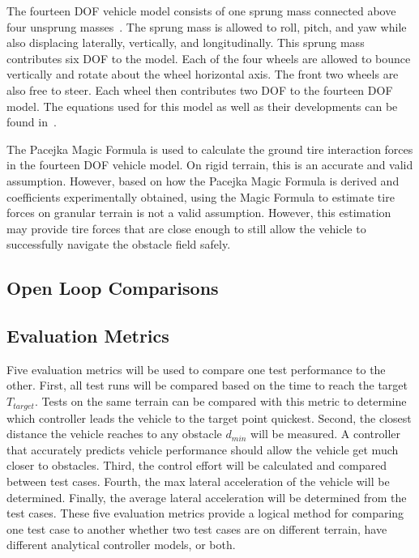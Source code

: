 \documentclass[12pt,twocolumn]{article}
\begin{document}
The fourteen DOF vehicle model consists of one sprung mass connected above four unsprung masses~\cite{RollStudies2007}. The sprung mass is allowed to roll, pitch, and yaw while also displacing laterally, vertically, and longitudinally. This sprung mass contributes six DOF to the model. Each of the four wheels are allowed to bounce vertically and rotate about the wheel horizontal axis. The front two wheels are also free to steer. Each wheel then contributes two DOF to the fourteen DOF model. The equations used for this model as well as their developments can be found in~\cite{RollStudies2007}.

The Pacejka Magic Formula is used to calculate the ground tire interaction forces in the fourteen DOF vehicle model. On rigid terrain, this is an accurate and valid assumption. However, based on how the Pacejka Magic Formula is derived and coefficients experimentally obtained, using the Magic Formula to estimate tire forces on granular terrain is not a valid assumption. However, this estimation may provide tire forces that are close enough to still allow the vehicle to successfully navigate the obstacle field safely. 

\subsection{Open Loop Comparisons }\label{ss:OpenLoop}


\subsection{Evaluation Metrics}\label{ss:Metrics}
Five evaluation metrics will be used to compare one test performance to the other. First, all test runs will be compared based on the time to reach the target $T_{target}$. Tests on the same terrain can be compared with this metric to determine which controller leads the vehicle to the target point quickest. Second, the closest distance the vehicle reaches to any obstacle $d_{min}$ will be measured. A controller that accurately predicts vehicle performance should allow the vehicle get much closer to obstacles. Third, the control effort will be calculated and compared between test cases. Fourth, the max lateral acceleration of the vehicle will be determined. Finally, the average lateral acceleration will be determined from the test cases. These five evaluation metrics provide a logical method for comparing one test case to another whether two test cases are on different terrain, have different analytical controller models, or both. 
\end{document}
